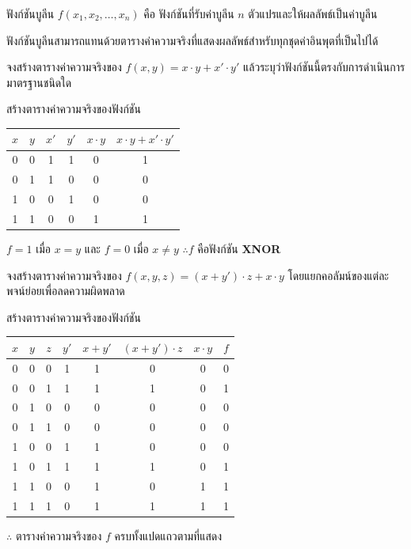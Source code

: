 \begin{definition}[ฟังก์ชันบูลีน]
ฟังก์ชันบูลีน $f(x_1, x_2, \ldots, x_n)$ คือ ฟังก์ชันที่รับค่าบูลีน $n$ ตัวแปรและให้ผลลัพธ์เป็นค่าบูลีน
\end{definition}

ฟังก์ชันบูลีนสามารถแทนด้วยตารางค่าความจริงที่แสดงผลลัพธ์สำหรับทุกชุดค่าอินพุตที่เป็นไปได้

\begin{ex}
\label{ex:truth-table-2var}
จงสร้างตารางค่าความจริงของ $f(x, y) = x \cdot y + x' \cdot y'$ แล้วระบุว่าฟังก์ชันนี้ตรงกับการดำเนินการมาตรฐานชนิดใด
\end{ex}
\begin{solution}
สร้างตารางค่าความจริงของฟังก์ชัน
\begin{center}
\begin{tabular}{|c|c|c|c|c|c|}
\hline
$x$ & $y$ & $x'$ & $y'$ & $x \cdot y$ & $x \cdot y + x' \cdot y'$ \\
\hline
0 & 0 & 1 & 1 & 0 & 1 \\
\hline
0 & 1 & 1 & 0 & 0 & 0 \\
\hline
1 & 0 & 0 & 1 & 0 & 0 \\
\hline
1 & 1 & 0 & 0 & 1 & 1 \\
\hline
\end{tabular}
\end{center}
$f = 1$ เมื่อ $x = y$ และ $f = 0$ เมื่อ $x \neq y$ $\therefore f$ คือฟังก์ชัน \textbf{XNOR} \solhere
\end{solution}

\begin{ex}
\label{ex:truth-table-3var}
จงสร้างตารางค่าความจริงของ $f(x, y, z) = (x + y') \cdot z + x \cdot y$ โดยแยกคอลัมน์ของแต่ละพจน์ย่อยเพื่อลดความผิดพลาด
\end{ex}
\begin{solution}
สร้างตารางค่าความจริงของฟังก์ชัน
\begin{center}
\begin{tabular}{|c|c|c|c|c|c|c|c|}
\hline
$x$ & $y$ & $z$ & $y'$ & $x + y'$ & $(x + y') \cdot z$ & $x \cdot y$ & $f$ \\
\hline
0 & 0 & 0 & 1 & 1 & 0 & 0 & 0 \\
\hline
0 & 0 & 1 & 1 & 1 & 1 & 0 & 1 \\
\hline
0 & 1 & 0 & 0 & 0 & 0 & 0 & 0 \\
\hline
0 & 1 & 1 & 0 & 0 & 0 & 0 & 0 \\
\hline
1 & 0 & 0 & 1 & 1 & 0 & 0 & 0 \\
\hline
1 & 0 & 1 & 1 & 1 & 1 & 0 & 1 \\
\hline
1 & 1 & 0 & 0 & 1 & 0 & 1 & 1 \\
\hline
1 & 1 & 1 & 0 & 1 & 1 & 1 & 1 \\
\hline
\end{tabular}
\end{center}

$\therefore$ ตารางค่าความจริงของ $f$ ครบทั้งแปดแถวตามที่แสดง \solhere
\end{solution}

